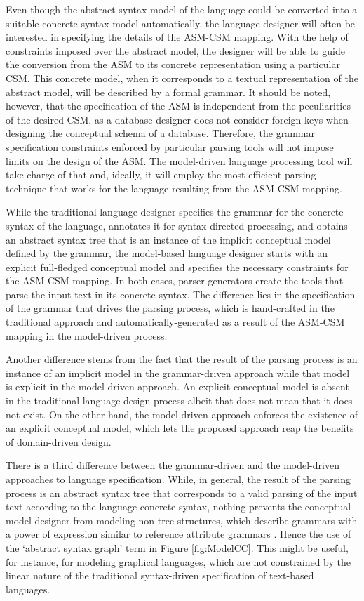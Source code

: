 \documentclass[preprint]{elsarticle}
\begin{document}
Even though the abstract syntax model of the language could be converted into a suitable concrete syntax model automatically, the language designer will often be interested in specifying the details of the ASM-CSM mapping.
With the help of constraints imposed over the abstract model, the designer will be able to guide the conversion from the ASM to its concrete representation using a particular CSM.
This concrete model, when it corresponds to a textual representation of the abstract model, will be described by a formal grammar.
It should be noted, however, that the specification of the ASM is independent from the peculiarities of the desired CSM, as a database designer does not consider foreign keys when designing the conceptual schema of a database.
Therefore, the grammar specification constraints enforced by particular parsing tools will not impose limits on the design of the ASM.
The model-driven language processing tool will take charge of that and, ideally, it will employ the most efficient parsing technique that works for the language resulting from the ASM-CSM mapping.

While the traditional language designer specifies the grammar for the concrete syntax of the language, annotates it for syntax-directed processing, and obtains an abstract syntax tree that is an instance of the implicit conceptual model defined by the grammar, the model-based language designer starts with an explicit full-fledged conceptual model and specifies the necessary constraints for the ASM-CSM mapping.
In both cases, parser generators create the tools that parse the input text in its concrete syntax.
The difference lies in the specification of the grammar that drives the parsing process, which is hand-crafted in the traditional approach and automatically-generated as a result of the ASM-CSM mapping in the model-driven process.

Another difference stems from the fact that the result of the parsing process is an instance of an implicit model in the grammar-driven approach while that model is explicit in the model-driven approach.
An explicit conceptual model is absent in the traditional language design process albeit that does not mean that it does not exist.
On the other hand, the model-driven approach enforces the existence of an explicit conceptual model, which lets the proposed approach reap the benefits of domain-driven design.

There is a third difference between the grammar-driven and the model-driven approaches to language specification.
While, in general, the result of the parsing process is an abstract syntax tree that corresponds to a valid parsing of the input text according to the language concrete syntax, nothing prevents the conceptual model designer from modeling non-tree structures, which describe grammars with a power of expression similar to reference attribute grammars \cite{Burger2010}.
Hence the use of the `abstract syntax graph' term in Figure \ref{fig:ModelCC}.
This might be useful, for instance, for modeling graphical languages, which are not constrained by the linear nature of the traditional syntax-driven specification of text-based languages.
\end{document}
